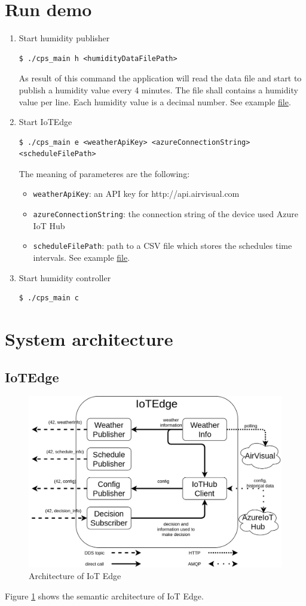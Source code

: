 \documentclass{article}
\begin{document}
\section{Run demo}
\begin{enumerate}
\item Start humidity publisher
\begin{verbatim}
$ ./cps_main h <humidityDataFilePath>
\end{verbatim}
As result of this command the application will read the data file and start to publish a humidity value every 4 minutes. The file shall contains a humidity value per line. Each humidity value is a decimal number. See example \href{https://github.com/antaljanosbenjamin/cps_homework/blob/master/examples/humidity.txt}{file}.
\item Start IoTEdge 
\begin{lstlisting}
$ ./cps_main e <weatherApiKey> <azureConnectionString> <scheduleFilePath>
\end{lstlisting} 
The meaning of parameteres are the following:
\begin{itemize}
\item \verb+weatherApiKey+: an API key for http://api.airvisual.com
\item \verb+azureConnectionString+: the connection string of the device used Azure IoT Hub
\item \verb+scheduleFilePath+: path to a CSV file which stores the schedules time intervals. See example \href{https://github.com/antaljanosbenjamin/cps_homework/blob/master/examples/schedule.csv}{file}.
\end{itemize}
\item Start humidity controller
\begin{verbatim}
$ ./cps_main c
\end{verbatim}
\end{enumerate}
\section{System architecture}
\subsection{IoTEdge}
\begin{figure}
  \includegraphics[width=\linewidth]{imgs/edge.png}
  \caption{Architecture of IoT Edge}
  \label{fig:arc_edge}
\end{figure}

Figure \ref{fig:arc_edge} shows the semantic architecture of IoT Edge.
\end{document}
